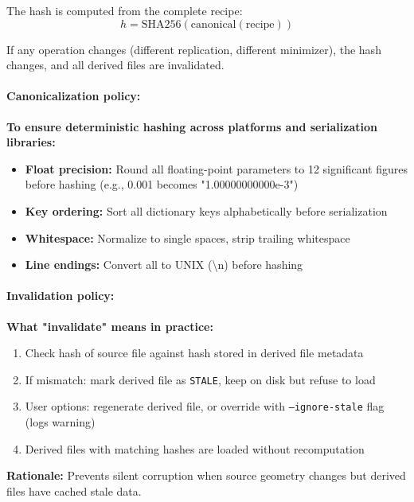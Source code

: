 \documentclass[11pt]{article}
\begin{document}
The hash is computed from the complete recipe:
\begin{equation}
h = \text{SHA256}(\text{canonical}(\text{recipe}))
\end{equation}

If any operation changes (different replication, different minimizer), the hash changes, and all derived files are invalidated.

\paragraph{Canonicalization policy:}

\textbf{To ensure deterministic hashing across platforms and serialization libraries:}

\begin{itemize}
\item \textbf{Float precision:} Round all floating-point parameters to 12 significant figures before hashing (e.g., 0.001 becomes "1.00000000000e-3")
\item \textbf{Key ordering:} Sort all dictionary keys alphabetically before serialization
\item \textbf{Whitespace:} Normalize to single spaces, strip trailing whitespace
\item \textbf{Line endings:} Convert all to UNIX (\textbackslash n) before hashing
\end{itemize}

\paragraph{Invalidation policy:}

\textbf{What "invalidate" means in practice:}

\begin{enumerate}
\item Check hash of source file against hash stored in derived file metadata
\item If mismatch: mark derived file as \texttt{STALE}, keep on disk but refuse to load
\item User options: regenerate derived file, or override with \texttt{--ignore-stale} flag (logs warning)
\item Derived files with matching hashes are loaded without recomputation
\end{enumerate}

\textbf{Rationale:} Prevents silent corruption when source geometry changes but derived files have cached stale data.
\end{document}
